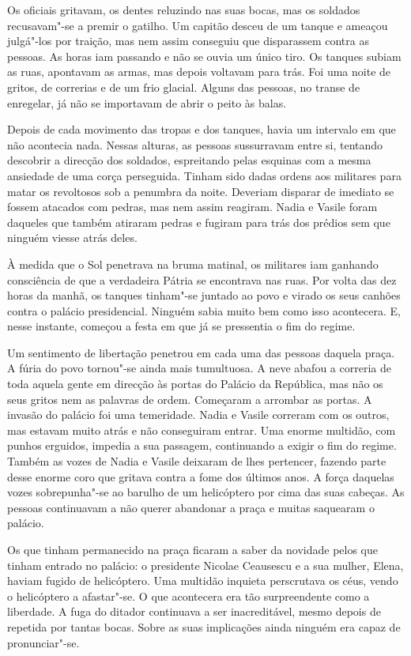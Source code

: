 Os oficiais gritavam, os dentes reluzindo nas suas bocas, mas os
soldados recusavam"-se a premir o gatilho. Um capitão desceu de um tanque
e ameaçou julgá"-los por traição, mas nem assim conseguiu que disparassem
contra as pessoas. As horas iam passando e não se ouvia um único tiro.
Os tanques subiam as ruas, apontavam as armas, mas depois voltavam para
trás. Foi uma noite de gritos, de correrias e de um frio glacial. Alguns
das pessoas, no transe de enregelar, já não se importavam de abrir o
peito às balas.

Depois de cada movimento das tropas e dos tanques, havia um intervalo em
que não acontecia nada. Nessas alturas, as pessoas sussurravam entre si,
tentando descobrir a direcção dos soldados, espreitando pelas esquinas
com a mesma ansiedade de uma corça perseguida. Tinham sido dadas ordens
aos militares para matar os revoltosos sob a penumbra da noite. Deveriam
disparar de imediato
se fossem atacados com pedras, mas nem assim reagiram. Nadia e Vasile
foram daqueles que também atiraram pedras e fugiram para trás dos
prédios sem que ninguém viesse atrás deles.

À medida que o Sol penetrava na bruma matinal, os militares iam ganhando
consciência de que a verdadeira Pátria se encontrava nas ruas. Por volta
das dez horas da manhã, os tanques tinham"-se juntado ao povo e virado os
seus canhões contra o palácio presidencial. Ninguém sabia muito bem como
isso acontecera. E, nesse instante, começou a festa em que já se
pressentia o fim do regime.

Um sentimento de libertação penetrou em cada uma das pessoas daquela
praça. A fúria do povo tornou"-se ainda mais tumultuosa. A neve abafou a
correria de toda aquela gente em direcção às portas do Palácio da
República, mas não os seus gritos nem as palavras de ordem. Começaram a
arrombar as portas. A invasão do palácio foi uma temeridade. Nadia e
Vasile correram com os outros, mas estavam muito atrás e não
conseguiram entrar. Uma enorme multidão, com punhos erguidos, impedia a
sua passagem, continuando a exigir o fim do regime. Também as vozes de
Nadia e Vasile deixaram de lhes pertencer, fazendo parte desse enorme
coro que gritava contra a fome dos últimos anos. A força daquelas vozes
sobrepunha"-se ao barulho de um helicóptero por cima das suas cabeças. As
pessoas continuavam a não querer abandonar a praça e muitas saquearam o
palácio.

\bigskip

Os que tinham permanecido na praça ficaram a saber da novidade pelos que
tinham entrado no palácio: o presidente Nicolae Ceausescu e a sua mulher, Elena, haviam fugido de
helicóptero. Uma multidão inquieta perscrutava os céus, vendo o
helicóptero a afastar"-se. O que acontecera era tão surpreendente como a
liberdade. A fuga do ditador continuava a ser inacreditável, mesmo
depois de repetida por tantas bocas. Sobre as suas implicações ainda
ninguém era capaz de pronunciar"-se.

